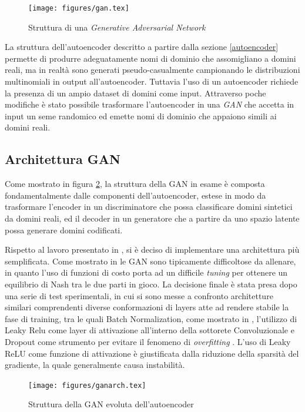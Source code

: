 \begin{figure}[!htb]
    \centering
	\texttt{[image: figures/gan.tex]}
	\caption{Struttura di una \textit{Generative Adversarial Network}}
\label{fig:gan}
\end{figure}


La struttura dell'autoencoder descritto a partire dalla sezione \ref{autoencoder} permette di produrre adeguatamente nomi di dominio che assomigliano a domini reali, ma in realtà sono generati pseudo-casualmente campionando le distribuzioni multinomiali in output all'autoencoder. Tuttavia l'uso di un autoencoder richiede la presenza di un ampio dataset di domini come input. Attraverso poche modifiche è stato possibile trasformare l'autoencoder in una \textit{GAN} che accetta in input un seme randomico ed emette nomi di dominio che appaiono simili ai domini reali.

\subsection{Architettura GAN}
\label{ganarch}
Come mostrato in figura \ref{fig:archgan}, la struttura della GAN in esame è composta fondamentalmente dalle componenti dell'autoencoder, estese in modo da trasformare l'encoder in un discriminatore che possa classificare domini sintetici da domini reali, ed il decoder in un generatore che a partire da uno spazio latente possa generare domini codificati.

Rispetto al lavoro presentato in \cite{deepdga}, si è deciso di implementare una architettura più semplificata. Come mostrato in \cite{1606.03498} le GAN sono tipicamente difficoltose da allenare, in quanto l'uso di funzioni di costo porta ad un difficile \textit{tuning} per ottenere un equilibrio di Nash tra le due parti in gioco. La decisione finale è stata presa dopo una serie di test sperimentali, in cui si sono messe a confronto architetture similari comprendenti diverse conformazioni di layers atte ad rendere stabile la fase di training, tra le quali Batch Normalization, come mostrato in \cite{1502.03167},  l'utilizzo di Leaky Relu \cite{GANhacks} come layer di attivazione all'interno della sottorete Convoluzionale e Dropout come strumento per evitare il fenomeno di \textit{overfitting} \cite{dropout}. L'uso di Leaky ReLU come funzione di attivazione è giustificata dalla riduzione della sparsità  del gradiente, la quale generalmente causa instabilità.

\begin{figure}[!htb]
    \centering
	\texttt{[image: figures/ganarch.tex]}
	\caption{Struttura della GAN evoluta dell'autoencoder}
\label{fig:archgan}
\end{figure}

